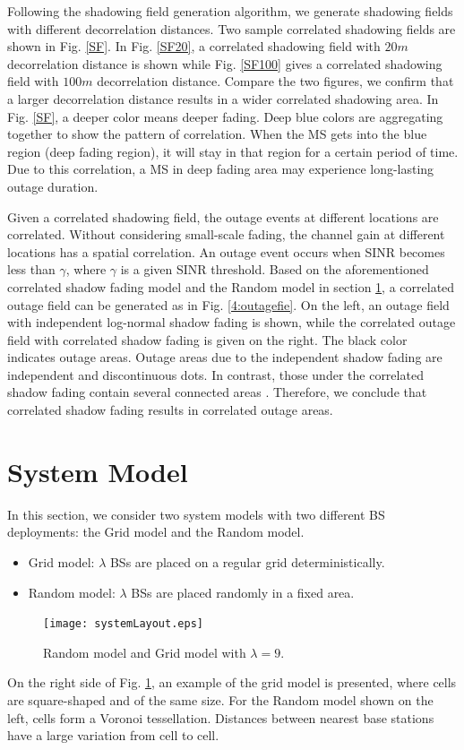\documentclass[journal,10pt]{IEEEtran}
\begin{document}
Following the shadowing field generation algorithm, we generate shadowing fields with different  decorrelation distances. Two sample correlated shadowing fields are shown in Fig. \ref{SF}. In Fig. \ref{SF20}, a correlated shadowing field with $20m$ decorrelation distance is shown while Fig. \ref{SF100} gives a correlated shadowing field with $100m$ decorrelation distance. Compare the two figures, we confirm that a larger decorrelation distance results in a wider correlated shadowing area. In Fig. \ref{SF}, a deeper color means deeper fading. Deep blue colors are aggregating together to show the pattern of correlation. When the MS gets into the blue region (deep fading region), it will stay in that region for a certain period of time. Due to this correlation, a MS in deep fading area may experience long-lasting outage duration.
\par Given a correlated shadowing field, the outage events at different locations are correlated. Without considering small-scale fading, the channel gain at different locations has a spatial correlation. An outage event occurs when SINR becomes less than $\gamma$, where $\gamma$ is a given SINR threshold. Based on the aforementioned correlated shadow fading model and the Random model in section \ref{SystemModel}, a correlated outage field can be generated as in Fig. \ref{4:outagefie}. On the left, an outage field with independent log-normal shadow fading is shown, while the correlated outage field with correlated shadow fading is given on the right. The black color indicates outage areas. Outage areas due to the independent shadow fading are independent and discontinuous dots. In contrast, those under the correlated shadow fading contain several connected areas . Therefore, we conclude that correlated shadow fading results in correlated outage areas.


 \section{System Model}
 \label{SystemModel}
 In this section, we consider two system models with two different BS deployments: the Grid model and the Random model.
 \begin{itemize}
 \item Grid model: $\lambda$ BSs are placed on a regular grid deterministically.
 \item Random model: $\lambda$ BSs are placed randomly in a fixed area.
 \end{itemize}
 \begin{figure}
 \centering
 \texttt{[image: systemLayout.eps]}
 \caption{Random model and Grid model with $\lambda = 9$.}
 \label{4:RandomLayout}
 \end{figure}
On the right side of Fig. \ref{4:RandomLayout}, an example of the grid model is presented, where cells are square-shaped and of the same size. For the Random model shown on the left, cells form a Voronoi tessellation. Distances between nearest base stations have a large variation from cell to cell.
\end{document}
